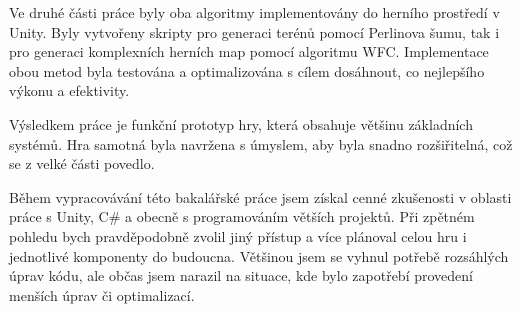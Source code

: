 Ve druhé části práce byly oba algoritmy implementovány do herního prostředí v Unity. Byly vytvořeny skripty pro generaci terénů pomocí Perlinova šumu, tak i pro generaci komplexních herních map pomocí algoritmu WFC. Implementace obou metod byla testována a optimalizována s cílem dosáhnout, co nejlepšího výkonu a efektivity.

Výsledkem práce je funkční prototyp hry, která obsahuje většinu základních systémů. Hra samotná byla navržena s úmyslem, aby byla snadno rozšiřitelná, což se z velké části povedlo.

Během vypracovávání této bakalářské práce jsem získal cenné zkušenosti v oblasti práce s Unity, C\# a obecně s programováním větších projektů. Při zpětném pohledu bych pravděpodobně zvolil jiný přístup a více plánoval celou hru i jednotlivé komponenty do budoucna. Většinou jsem se vyhnul potřebě rozsáhlých úprav kódu, ale občas jsem narazil na situace, kde bylo zapotřebí provedení menších úprav či optimalizací.